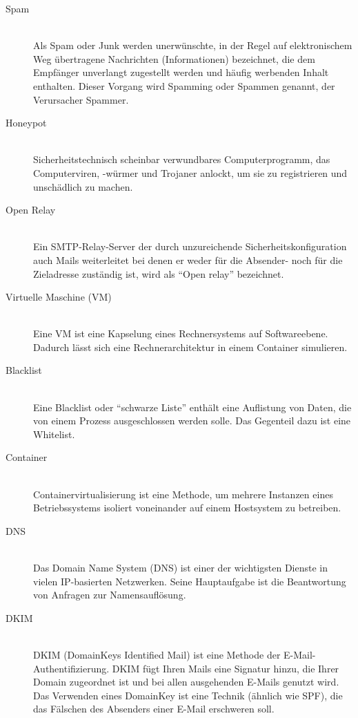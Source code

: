 \documentclass[a4paper,11pt,singlespacing]{article}
\begin{document}
	\begin{description}
	\item[Spam\label{itm:Spam}]\hfill \\
		Als Spam oder Junk werden unerwünschte, in der Regel auf elektronischem Weg übertragene Nachrichten (Informationen) bezeichnet, die dem Empfänger unverlangt zugestellt werden und häufig werbenden Inhalt enthalten. Dieser Vorgang wird Spamming oder Spammen genannt, der Verursacher Spammer.\cite{Spam}
	\item[Honeypot\label{itm:Honeypot}]\hfill \\
		Sicherheitstechnisch scheinbar verwundbares Computerprogramm, das Computerviren, -würmer und Trojaner anlockt, um sie zu registrieren und unschädlich zu machen.\cite{Honeypot}
	\item[Open Relay\label{itm:OpenRelay}]\hfill \\
		Ein SMTP-Relay-Server der durch unzureichende Sicherheitskonfiguration auch Mails weiterleitet bei denen er weder für die Absender- noch für die Zieladresse zuständig ist, wird als "`Open relay"' bezeichnet.\cite{SMTP-Relay-Server}
	\item[Virtuelle Maschine (VM)\label{itm:VirtuelleMaschine}]\hfill \\
		Eine VM ist eine Kapselung eines Rechnersystems auf Softwareebene. Dadurch lässt sich eine Rechnerarchitektur in einem Container simulieren. \cite{VM}
	\item[Blacklist \label{itm:Blacklist}]\hfill \\
		Eine Blacklist oder "`schwarze Liste"' enthält eine Auflistung von Daten, die von einem Prozess ausgeschlossen werden solle. Das Gegenteil dazu ist eine Whitelist. \cite{Blacklist}
	\item[Container\label{itm:Container}]\hfill \\
		Containervirtualisierung ist eine Methode, um mehrere Instanzen eines Betriebssystems isoliert voneinander auf einem Hostsystem zu betreiben.\cite{Container}
	\item[DNS\label{itm:DNS}]\hfill \\
		Das Domain Name System (DNS) ist einer der wichtigsten Dienste in vielen IP-basierten Netzwerken. Seine Hauptaufgabe ist die Beantwortung von Anfragen zur Namensauflösung.\cite{DNS}
	\item[DKIM\label{itm:DKIM}]\hfill \\
		DKIM (DomainKeys Identified Mail) ist eine Methode der E-Mail-Authentifizierung. DKIM fügt Ihren Mails eine Signatur hinzu, die Ihrer Domain zugeordnet ist und bei allen ausgehenden E-Mails genutzt wird. Das Verwenden eines DomainKey ist eine Technik (ähnlich wie SPF), die das Fälschen des Absenders einer E-Mail erschweren soll.\cite{DKIM}

\end{description}
\end{document}
